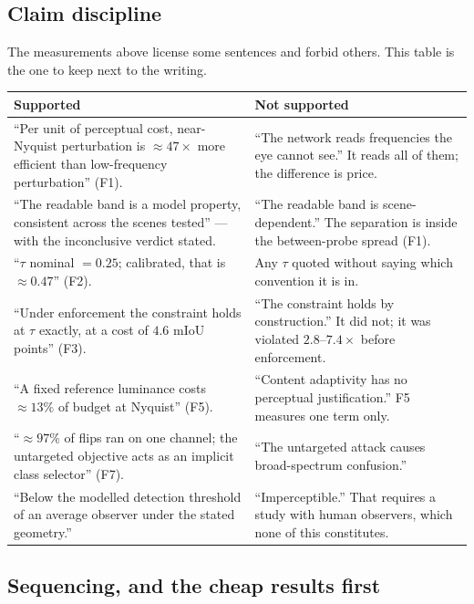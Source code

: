 \documentclass[11pt,a4paper]{article}
\begin{document}
\subsection{Claim discipline}

The measurements above license some sentences and forbid others. This table
is the one to keep next to the writing.
\begin{center}
\small
\begin{tabular}{@{}L{6.7cm}L{7.6cm}@{}}
\toprule
\textbf{Supported} & \textbf{Not supported} \\
\midrule
``Per unit of perceptual cost, near-Nyquist perturbation is
$\approx47\times$ more efficient than low-frequency perturbation'' (F1). &
``The network reads frequencies the eye cannot see.'' It reads all of them;
the difference is price. \\
``The readable band is a model property, consistent across the scenes
tested'' --- with the inconclusive verdict stated. &
``The readable band is scene-dependent.'' The separation is inside the
between-probe spread (F1). \\
``$\tau$ nominal $=0.25$; calibrated, that is $\approx0.47$'' (F2). &
Any $\tau$ quoted without saying which convention it is in. \\
``Under enforcement the constraint holds at $\tau$ exactly, at a cost of
$4.6$ mIoU points'' (F3). &
``The constraint holds by construction.'' It did not; it was violated
$2.8$--$7.4\times$ before enforcement. \\
``A fixed reference luminance costs $\approx13\%$ of budget at Nyquist''
(F5). &
``Content adaptivity has no perceptual justification.'' F5 measures one
term only. \\
``$\approx97\%$ of flips ran on one channel; the untargeted objective acts
as an implicit class selector'' (F7). &
``The untargeted attack causes broad-spectrum confusion.'' \\
``Below the modelled detection threshold of an average observer under the
stated geometry.'' &
``Imperceptible.'' That requires a study with human observers, which none of
this constitutes. \\
\bottomrule
\end{tabular}
\end{center}

\subsection{Sequencing, and the cheap results first}
\end{document}

